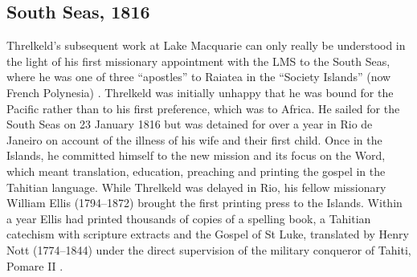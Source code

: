 \subsection{South Seas, 1816}

Threlkeld’s subsequent work at Lake Macquarie can only really be understood in the light of his first missionary appointment with the LMS to the South Seas, where he was one of three “apostles” to Raiatea in the “Society Islands” (now French Polynesia) \citep[106]{lovett_history_1899}. Threlkeld was initially unhappy that he was bound for the Pacific rather than to his first preference, which was to Africa. He sailed for the South Seas on 23 January 1816 but was detained for over a year in Rio de Janeiro on account of the illness of his wife and their first child. Once in the Islands, he committed himself to the new mission and its focus on the Word, which meant translation, education, preaching and printing the gospel in the Tahitian language. While Threlkeld was delayed in Rio, his fellow missionary William Ellis (1794--1872) brought the first printing press to the Islands. Within a year Ellis had printed thousands of copies of a spelling book, a Tahitian catechism with scripture extracts and the Gospel of St Luke, translated by Henry Nott (1774--1844) under the direct supervision of the military conqueror of Tahiti, Pomare II \citep[215]{lovett_history_1899}.


